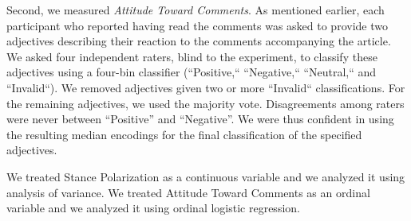 Second, we measured {\it Attitude Toward Comments}.  As mentioned earlier, each participant who reported having read the comments was asked to provide two adjectives describing their reaction to the comments accompanying the article.
We asked four independent raters, blind to the experiment, to classify these adjectives using a four-bin classifier (``Positive,`` ``Negative,`` ``Neutral,`` and ``Invalid``). %
We removed adjectives given two or more ``Invalid`` classifications. %
For the remaining adjectives, we used the majority vote.  Disagreements among raters were never between ``Positive'' and ``Negative''.  
We were thus confident in using the resulting median encodings for the final classification of the specified adjectives.

We treated Stance Polarization as a continuous variable and we analyzed it using analysis of variance.
We treated Attitude Toward Comments as an ordinal variable and we analyzed it using ordinal logistic regression.

